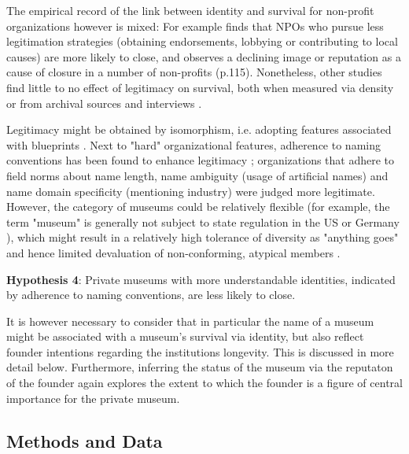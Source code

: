 \documentclass[12pt]{article}
\begin{document}
The empirical record of the link between identity and survival for non-profit organizations however is mixed: 
For example \textcite{Bielefeld_1994_survival} finds that NPOs who pursue less legitimation strategies (obtaining endorsements, lobbying or contributing to local causes) are more likely to close, and \textcite{HernandezOrtiz_2022_discontinuity} observes a declining image or reputation as a cause of closure in a number of non-profits (p.115).
Nonetheless, other studies find little to no effect of legitimacy on survival, both when measured via density \parencite{Bogaert_etal_2014_ecological} or from archival sources and interviews \parencite{Fernandez_2007_dissolution}.


Legitimacy might be obtained by isomorphism, i.e. adopting features associated with blueprints \parencite{diMaggio_1983_iron}.
Next to "hard" organizational features, adherence to naming conventions has been found to enhance legitimacy \parencite{Glynn_Abzug_2002_names}; organizations that adhere to field norms about name length, name ambiguity (usage of artificial names) and name domain specificity (mentioning industry) were judged more legitimate. 
However, the category of museums could be relatively flexible (for example, the term "museum" is generally not subject to state regulation in the US or Germany \parencite{Museumsbund_ICOMDE_2006_standards,Lister_2023_marketing}), which might result in a relatively high tolerance of diversity as "anything goes" and hence limited devaluation of non-conforming, atypical members \parencite{Bogaert_etal_2014_ecological}.


\bigbreak
\noindent
\textbf{Hypothesis 4}: Private museums with more understandable identities, indicated by adherence to naming conventions, are less likely to close. 


It is however necessary to consider that in particular the name of a museum might be associated with a museum's survival via identity, but also reflect founder intentions regarding the institutions longevity.
This is discussed in more detail below.
Furthermore, inferring the status of the museum via the reputaton of the founder again explores the extent to which the founder is a figure of central importance for the private museum.
\subsection*{Methods and Data}
\end{document}
